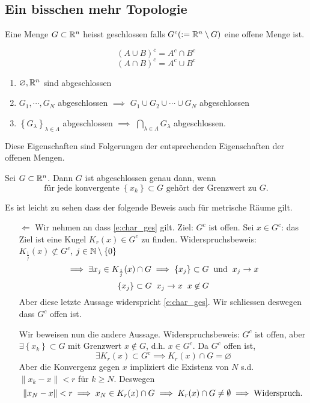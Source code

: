 \subsection{Ein bisschen mehr Topologie}
\begin{Def}
  Eine Menge $G\subset\mathbb{R}^n$ heisst geschlossen falls $G^c(:=\mathbb{R}^n\setminus G)$ eine offene Menge ist.
\end{Def}
\begin{Bem}
  \[(A\cup B)^c = A^c\cap B^c\]
  \[(A\cap B)^c = A^c\cup B^c\]
\end{Bem}
\begin{Sat}
  \begin{enumerate}
    \item $\varnothing, \mathbb{R}^n$ sind abgeschlossen
    \item $G_1,\cdots,G_N$ abgeschlossen $\implies$ $G_1\cup G_2\cup \cdots\cup G_N$ abgeschlossen
    \item $\left\{ G_\lambda \right\}_{\lambda\in\Lambda}$ abgeschlossen $\implies$ $\bigcap_{\lambda\in\Lambda} G_\lambda$ abgeschlossen.
  \end{enumerate}
\end{Sat}
\begin{Bew}
Diese Eigenschaften sind Folgerungen der entsprechenden Eigenschaften der offenen Mengen.
\end{Bew}
\begin{Sat} Sei
  $G\subset\mathbb{R}^n$. Dann $G$ ist abgeschlossen genau dann, wenn
 \begin{equation}\label{e:char_ges}
\mbox{f\"ur jede konvergente $\left\{ x_k \right\}\subset G$ gehört der Grenzwert zu $G$.}
\end{equation}
\end{Sat}
\begin{Bem}
Es ist leicht zu sehen dass der folgende Beweis auch f\"ur metrische R\"aume gilt.
\end{Bem}
\begin{Bew}
  \begin{itemize}
    \item[$\Leftarrow$] Wir nehmen an dass \eqref{e:char_ges} gilt. Ziel: $G^c$ ist offen. Sei $x\in G^c$: das Ziel ist eine Kugel $K_r(x)\in G^c$ zu finden. Widerspruchsbeweis: $K_{\frac{1}{j}}(x)\not\subset G^c$, $j\in\mathbb{N}\setminus\left\{ 0 \right\}$
      \[\implies \exists x_j\in K_{\frac{1}{j}}(x)\cap G\implies \left\{ x_j \right\}\subset G\hspace{2mm}\text{und}\hspace{2mm} x_j\rightarrow x \]
      \[\left\{ x_j \right\}\subset G\hspace{2mm} x_j\rightarrow x\hspace{2mm} x\not\in G\]
Aber diese letzte Aussage widerspricht \eqref{e:char_ges}.
Wir schliessen deswegen dass $G^c$ offen ist. 

Wir beweisen nun die andere Aussage.  Widerspruchsbeweis: $G^c$ ist offen, aber $\exists \left\{ x_k \right\}\subset G$ mit Grenzwert $x\not\in G$, d.h. $x\in G^c$. Da $G^c$ offen ist,
      \[\exists K_r(x)\subset G^c\implies K_r(x)\cap G=\varnothing\]
Aber die Konvergenz gegen $x$ impliziert die Existenz von $N$ s.d. $\|x_k-x\|< r$ f\"ur $k\geq N$.
Deswegen      
\[\left\| x_N-x \right\|<r\implies x_N\in K_r(x)\cap G \implies K_r (x)\cap G\neq \emptyset \implies
\mbox{Widerspruch.}\]
  \end{itemize}
\end{Bew}
